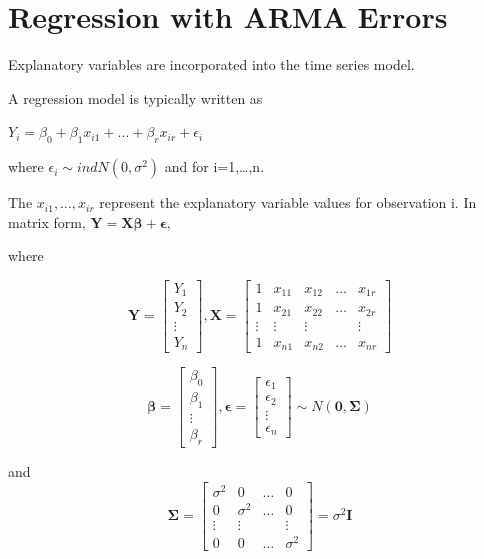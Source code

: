 \documentclass[
]{book}
\theoremstyle{definition}
\theoremstyle{definition}
\theoremstyle{definition}
\theoremstyle{definition}
\theoremstyle{remark}
\begin{document}
\hypertarget{regression-with-arma-errors}{%
\chapter{Regression with ARMA Errors}\label{regression-with-arma-errors}}

Explanatory variables are incorporated into the time series model.

A regression model is typically written as

\(Y_i=\beta_0+\beta_1x_{i1}+...+\beta_rx_{ir}+\epsilon_i\)

where \(\epsilon_i\sim ind N(0,\sigma^2)\) and for i=1,\ldots,n.

The \(x_{i1}, …, x_{ir}\) represent the explanatory variable values for observation i. In matrix form, \(\boldsymbol Y =\boldsymbol{X\beta} + \boldsymbol{\epsilon}\),

where

\[\boldsymbol Y=\begin{bmatrix} Y_1 \\Y_2 \\ \vdots \\ Y_n\end{bmatrix}, \boldsymbol X=\begin{bmatrix} 1 & x_{11} & x_{12} & \dots & x_{1r} \\ 1 &  x_{21} & x_{22} & \dots & x_{2r}\\ \vdots & \vdots  & \vdots & & \vdots \\  1 &  x_{n1} & x_{n2} & \dots & x_{nr}  \end{bmatrix}\]

\[\boldsymbol \beta =\begin{bmatrix} \beta_0 \\ \beta_1 \\ \vdots \\ \beta_r \end{bmatrix}, \boldsymbol \epsilon =\begin{bmatrix} \epsilon_1 \\ \epsilon_2 \\ \vdots \\ \epsilon_n \end{bmatrix}\sim  N(\boldsymbol 0, \boldsymbol \Sigma)\]

and \[\boldsymbol \Sigma=\begin{bmatrix} \sigma^2 & 0 & \dots & 0 \\ 0 & \sigma^2  & \dots  & 0 \\ \vdots & \vdots & & \vdots \\ 0 & 0 & \dots & \sigma^2 \end{bmatrix}=\sigma^2 \boldsymbol I\]
\end{document}
